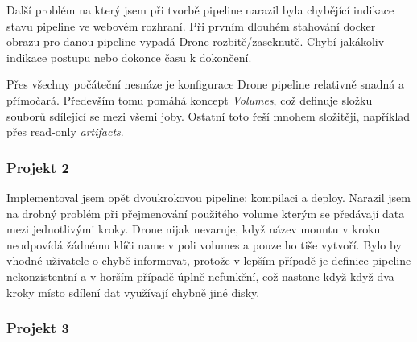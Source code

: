             Další problém na který jsem při tvorbě pipeline narazil byla chybějící indikace stavu pipeline ve webovém rozhraní. Při prvním dlouhém stahování docker obrazu pro danou pipeline vypadá Drone rozbitě/zaseknutě. Chybí jakákoliv indikace postupu nebo dokonce času k dokončení.

            Přes všechny počáteční nesnáze je konfigurace Drone pipeline relativně snadná a přímočará. Především tomu pomáhá koncept \textit{Volumes}, což definuje složku souborů sdílející se mezi všemi joby. Ostatní \CI toto řeší mnohem složitěji, například přes read-only \textit{artifacts}.

        \subsubsection{Projekt 2}
            Implementoval jsem opět dvoukrokovou pipeline: kompilaci a deploy. Narazil jsem na drobný problém při přejmenování použitého volume kterým se předávají data mezi jednotlivými kroky. Drone nijak nevaruje, když název mountu v kroku neodpovídá žádnému klíči name v poli volumes a pouze ho tiše vytvoří. Bylo by vhodné uživatele o chybě informovat, protože v lepším případě je definice pipeline nekonzistentní a v horším případě úplně nefunkční, což nastane když když dva kroky místo sdílení dat využívají chybně jiné disky.

        \subsubsection{Projekt 3}
            \blind[2]
